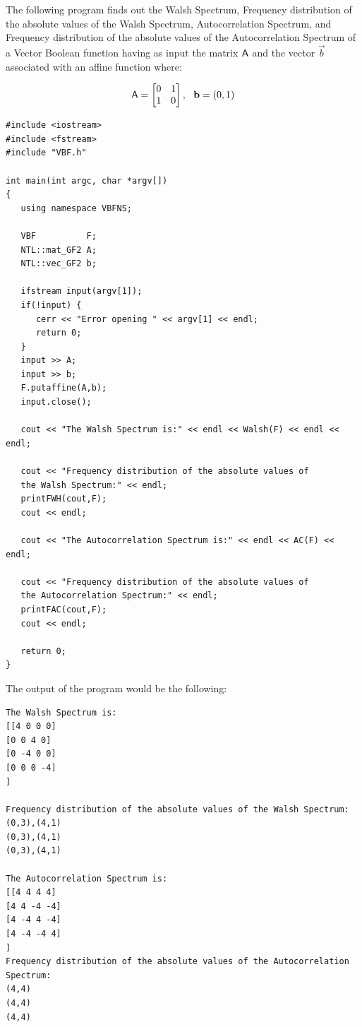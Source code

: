 \begin{example}
The following program finds out the Walsh Spectrum, Frequency distribution of the absolute values of the Walsh Spectrum,  Autocorrelation Spectrum, and Frequency distribution of the absolute values of the Autocorrelation Spectrum of a Vector Boolean function having as input the matrix $\matr{A}$ and the vector $\vec{b}$ associated with an affine function where:

\begin{equation*}
\matr{A} = \begin{bmatrix} 0 & 1 \\ 1 & 0 \\ \end{bmatrix}, \ \ \vec{b} = (0,1)
\end{equation*}

\begin{verbatim}
#include <iostream>
#include <fstream>
#include "VBF.h"

int main(int argc, char *argv[])
{
   using namespace VBFNS;

   VBF          F;
   NTL::mat_GF2 A;
   NTL::vec_GF2 b;

   ifstream input(argv[1]);
   if(!input) {
      cerr << "Error opening " << argv[1] << endl;
      return 0;
   }
   input >> A;
   input >> b;
   F.putaffine(A,b);
   input.close();

   cout << "The Walsh Spectrum is:" << endl << Walsh(F) << endl << endl;

   cout << "Frequency distribution of the absolute values of 
   the Walsh Spectrum:" << endl;
   printFWH(cout,F);
   cout << endl;

   cout << "The Autocorrelation Spectrum is:" << endl << AC(F) << endl;

   cout << "Frequency distribution of the absolute values of 
   the Autocorrelation Spectrum:" << endl;
   printFAC(cout,F);
   cout << endl;

   return 0;
}
\end{verbatim}

The output of the program would be the following:

\begin{verbatim}
The Walsh Spectrum is:
[[4 0 0 0]
[0 0 4 0]
[0 -4 0 0]
[0 0 0 -4]
]

Frequency distribution of the absolute values of the Walsh Spectrum:
(0,3),(4,1)
(0,3),(4,1)
(0,3),(4,1)

The Autocorrelation Spectrum is:
[[4 4 4 4]
[4 4 -4 -4]
[4 -4 4 -4]
[4 -4 -4 4]
]
Frequency distribution of the absolute values of the Autocorrelation Spectrum:
(4,4)
(4,4)
(4,4)

\end{verbatim}
\end{example}


